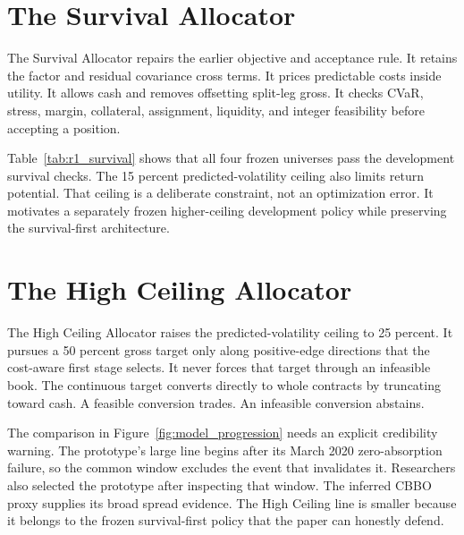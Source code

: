\section{The Survival Allocator}

The Survival Allocator repairs the earlier objective and acceptance rule. It retains the
factor and residual covariance cross terms. It prices predictable costs inside utility.
It allows cash and removes offsetting split-leg gross. It checks CVaR, stress, margin,
collateral, assignment, liquidity, and integer feasibility before accepting a position.

\begin{table}[!ht]
\centering
\caption{Survival Allocator monthly walk-forward development summary on the common
post-2020 window. Terminal wealth and tail statistics describe the whole-contract book.}
\label{tab:r1_survival}
\resizebox{\textwidth}{!}{}
\end{table}

Table~\ref{tab:r1_survival} shows that all four frozen universes pass the development
survival checks. The 15 percent predicted-volatility ceiling also limits return potential.
That ceiling is a deliberate constraint, not an optimization error. It motivates a
separately frozen higher-ceiling development policy while preserving the survival-first
architecture.

\FloatBarrier
\section{The High Ceiling Allocator}

The High Ceiling Allocator raises the predicted-volatility ceiling to 25 percent. It
pursues a 50 percent gross target only along positive-edge directions that the cost-aware
first stage selects. It never forces that target through an infeasible book. The
continuous target converts directly to whole contracts by truncating toward cash. A
feasible conversion trades. An infeasible conversion abstains.

The comparison in Figure~\ref{fig:model_progression} needs an explicit credibility
warning. The prototype's large line begins after its March 2020 zero-absorption failure,
so the common window excludes the event that invalidates it. Researchers also selected
the prototype after inspecting that window. The inferred CBBO proxy supplies its broad
spread evidence. The High Ceiling line is smaller because it belongs to the frozen
survival-first policy that the paper can honestly defend.

